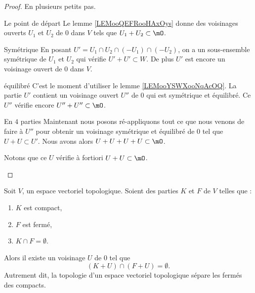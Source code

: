 \begin{proof}
    En plusieurs petits pas.
    \begin{subproof}
        \item[Le point de départ] 
            Le lemme \ref{LEMooQEFRooHAxOys} donne des voisinages ouverts \( U_1\) et \( U_2\) de \( 0\) dans \( V\) tels que \( U_1+U_2\subset \mO\).
        \item[Symétrique]
            En posant \( U' = U_1 \cap U_2 \cap (-U_1) \cap (-U_2) \), on a un sous-ensemble symétrique de \( U_1\) et \(U_2\) qui vérifie \( U' + U'\subset W \). De plus \( U'\) est encore un voisinage ouvert de \( 0\) dans \( V\).
        \item[équilibré]
            C'est le moment d'utiliser le lemme \ref{LEMooYSWXooNqAcOQ}. La partie \( U'\) contient un voisinage ouvert \( U''\) de \( 0\) qui est symétrique et équilibré. Ce \( U''\) vérifie encore \( U''+U''\subset \mO\).
        \item[En \( 4\) parties]
            Maintenant nous posons ré-appliquons tout ce que nous venons de faire à \( U''\) pour obtenir un voisinage symétrique et équilibré de \( 0\) tel que \( U+U\subset U'\). Nous avons alors \( U+U+U+U\subset \mO\).

            Notons que ce \( U\) vérifie à fortiori \( U+U\subset \mO\).
    \end{subproof}
\end{proof}


\begin{proposition}     \label{PROPooRMAOooZIgXwy}
    Soit \( V\), un espace vectoriel topologique. Soient des parties \( K\) et \( F\) de \( V\) telles que :
    \begin{enumerate}
        \item
            \( K\) est compact,
        \item
            \( F\) est fermé,
        \item
            \( K\cap F=\emptyset\).
    \end{enumerate}
    Alors il existe un voisinage \( U\) de \( 0\) tel que
    \begin{equation}
        (K+U)\cap (F+U)=\emptyset.
    \end{equation}
    Autrement dit, la topologie d'un espace vectoriel topologique sépare les fermés des compacts.
\end{proposition}

